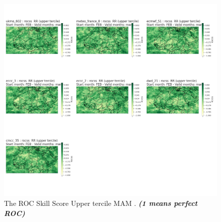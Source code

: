 \begin{figure}[H]
    \centering
    \includegraphics[scale=0.3]{plots/prob/rocss/rocss_mam_RR_upper.png}
    \caption{The ROC Skill Score Upper tercile MAM    . \textbf{\textit{(1 means perfect ROC)}}}
\end{figure}








